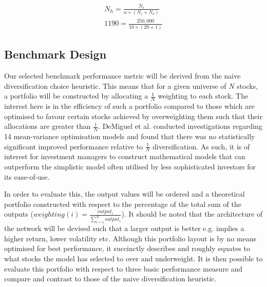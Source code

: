 \documentclass[10pt,onecolumn,letterpaper]{article}
\begin{document}
\vskip -0.5cm
\begin{gather*}
 	N_{h} = \frac{N_{s}}{\alpha \times (N_{i}+N_{o})} \\
	1190 = \frac{250,000}{10 \times (20+1)}
\end{gather*}


\subsection{Benchmark Design} \label{benchmark}

Our selected benchmark performance metric will be derived from the naive diversification choice heuristic. This means that for a given universe of $N$ stocks, a portfolio will be constructed by allocating a $\frac{1}{N}$ weighting to each stock. The interest here is in the efficiency of such a portfolio compared to those which are optimised to favour certain stocks achieved by overweighting them such that their allocations are greater than $\frac{1}{N}$. DeMiguel et al. conducted investigations\cite{DeMiguel} regarding 14 mean-variance optimisation models and found that there was no statistically significant improved performance relative to $\frac{1}{N}$ diversification. As such, it is of interest for investment managers to construct mathematical models that can outperform the simplistic model often utilised by less sophisticated investors for its ease-of-use. 

In order to evaluate this, the output values will be ordered and a theoretical portfolio constructed with respect to the percentage of the total sum of the outputs ($weighting(i) = \frac{output_{i} }{\sum_{i=1}^{N} output_{i}}$). It should be noted that the architecture of the network will be devised such that a larger output is better e.g. implies a higher return, lower volatility etc. Although this portfolio layout is by no means optimised for best performance, it succinctly describes and roughly equates to what stocks the model has selected to over and underweight. It is then possible to evaluate this portfolio with respect to three basic performance measure and compare and contrast to those of the naive diversification heuristic. 
\end{document}
